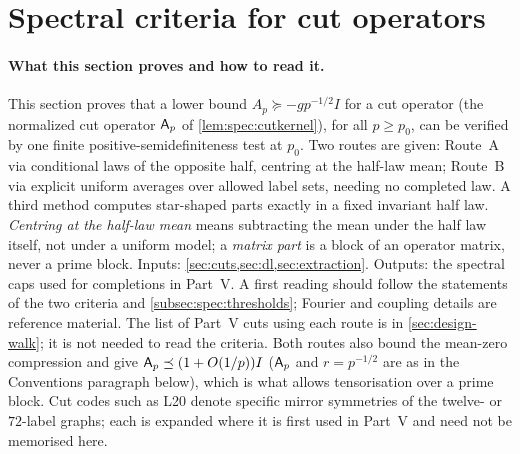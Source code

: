 
\section{Spectral criteria for cut operators}\label{sec:spectral}

\paragraph{What this section proves and how to read it.}
This section proves that a lower bound
$A_p\succeq -gp^{-1/2}I$ for a cut operator (the normalized cut operator $\mathsf A_p$ of \cref{lem:spec:cutkernel}), for all $p\ge p_0$, can
be verified by one finite positive-semidefiniteness test at $p_0$.
Two routes are given: Route~A via conditional laws of the opposite
half, centring at the half-law mean; Route~B via explicit uniform
averages over allowed label sets, needing no completed law. A third
method computes star-shaped parts exactly in a fixed invariant half
law. \emph{Centring at the half-law mean} means subtracting the mean
under the half law itself, not under a uniform model; a
\emph{matrix part} is a block of an operator matrix, never a prime
block. Inputs:
\cref{sec:cuts,sec:dl,sec:extraction}. Outputs: the spectral caps
used for completions in Part~V. A first reading should follow the
statements of the two criteria and \cref{subsec:spec:thresholds};
Fourier and coupling details are reference material. The list of
Part~V cuts using each route is in \cref{sec:design-walk}; it is not
needed to read the criteria. Both routes also bound the mean-zero
compression and give $\mathsf A_p\preceq(1+O(1/p))I$ ($\mathsf A_p$ and $r=p^{-1/2}$ are as in the Conventions paragraph below), which is what allows
tensorisation over a prime block. Cut codes such as L20 denote
specific mirror symmetries of the twelve- or $72$-label graphs; each
is expanded where it is first used in Part~V and need not be
memorised here.

